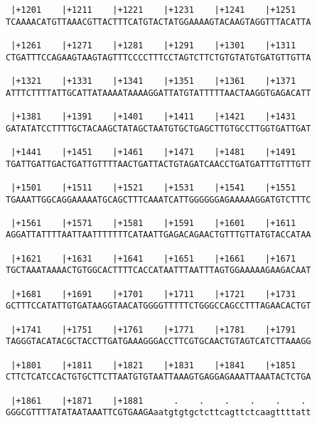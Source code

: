 \documentclass{article}
\begin{document}
\begin{Verbatim}
 |+1201    |+1211    |+1221    |+1231    |+1241    |+1251   
TCAAAACATGTTAAACGTTACTTTCATGTACTATGGAAAAGTACAAGTAGGTTTACATTA
                                                            
 |+1261    |+1271    |+1281    |+1291    |+1301    |+1311   
CTGATTTCCAGAAGTAAGTAGTTTCCCCTTTCCTAGTCTTCTGTGTATGTGATGTTGTTA
                                                            
 |+1321    |+1331    |+1341    |+1351    |+1361    |+1371   
ATTTCTTTTATTGCATTATAAAATAAAAGGATTATGTATTTTTAACTAAGGTGAGACATT
                                                            
 |+1381    |+1391    |+1401    |+1411    |+1421    |+1431   
GATATATCCTTTTGCTACAAGCTATAGCTAATGTGCTGAGCTTGTGCCTTGGTGATTGAT
                                                            
 |+1441    |+1451    |+1461    |+1471    |+1481    |+1491   
TGATTGATTGACTGATTGTTTTAACTGATTACTGTAGATCAACCTGATGATTTGTTTGTT
                                                            
 |+1501    |+1511    |+1521    |+1531    |+1541    |+1551   
TGAAATTGGCAGGAAAAATGCAGCTTTCAAATCATTGGGGGGAGAAAAAGGATGTCTTTC
                                                            
 |+1561    |+1571    |+1581    |+1591    |+1601    |+1611   
AGGATTATTTTAATTAATTTTTTTCATAATTGAGACAGAACTGTTTGTTATGTACCATAA
                                                            
 |+1621    |+1631    |+1641    |+1651    |+1661    |+1671   
TGCTAAATAAAACTGTGGCACTTTTCACCATAATTTAATTTAGTGGAAAAAGAAGACAAT
                                                            
 |+1681    |+1691    |+1701    |+1711    |+1721    |+1731   
GCTTTCCATATTGTGATAAGGTAACATGGGGTTTTTCTGGGCCAGCCTTTAGAACACTGT
                                                            
 |+1741    |+1751    |+1761    |+1771    |+1781    |+1791   
TAGGGTACATACGCTACCTTGATGAAAGGGACCTTCGTGCAACTGTAGTCATCTTAAAGG
                                                            
 |+1801    |+1811    |+1821    |+1831    |+1841    |+1851   
CTTCTCATCCACTGTGCTTCTTAATGTGTAATTAAAGTGAGGAGAAATTAAATACTCTGA
                                                            
 |+1861    |+1871    |+1881      .    .    .    .    .    . 
GGGCGTTTTATATAATAAATTCGTGAAGAaatgtgtgctcttcagttctcaagttttatt
                                                            

\end{Verbatim}
\end{document}
